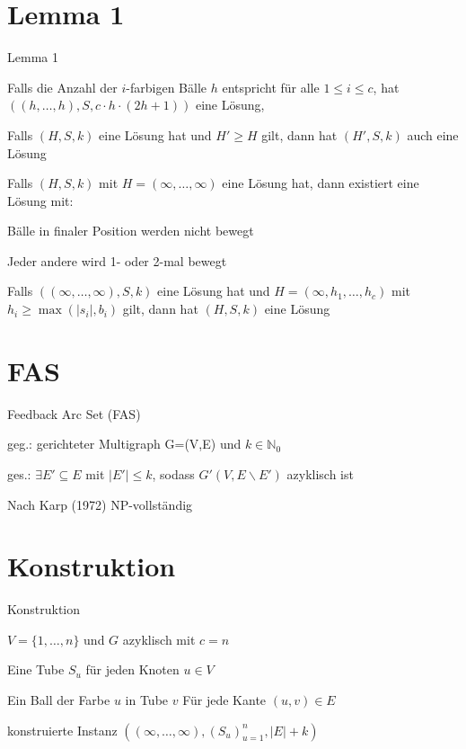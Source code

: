 \documentclass{beamer}
\begin{document}
\section*{Lemma 1}
\begin{frame}{Lemma 1}
\begin{enumlist}
\item Falls die Anzahl der $i$-farbigen Bälle $h$ entspricht für alle $1 \leq i \leq c$, hat $((h,\dots,h),S,c\cdot h\cdot (2h+1))$ eine Lösung, 
\item Falls $(H,S,k)$ eine Lösung hat und $H' \geq H$ gilt, dann hat $(H',S,k)$ auch eine Lösung
\item Falls $(H,S,k)$ mit $H=(\infty,\dots, \infty)$ eine Lösung hat, dann existiert eine Lösung mit: \begin{pointlist}
\item Bälle in finaler Position werden nicht bewegt
\item Jeder andere wird 1- oder 2-mal bewegt
\end{pointlist}
\item Falls $((\infty, \dots,\infty),S,k)$ eine Lösung hat und $H=(\infty, h_1,\dots, h_c)$ mit $h_i \geq \max(|s_i|,b_i)$ gilt, dann hat $(H,S,k)$ eine Lösung
\end{enumlist}
\end{frame}

\section*{FAS}
\begin{frame}{Feedback Arc Set (FAS)}
\begin{pointlist}
\item geg.: gerichteter Multigraph G=(V,E) und $k\in\mathbb{N}_0$
\item ges.: $\exists E' \subseteq E$ mit $|E'|\leq k$, sodass $G'(V,E\backslash E')$ azyklisch ist
\begin{arrowlist}
\item Nach Karp (1972) NP-vollständig
\end{arrowlist}
\end{pointlist}
\end{frame}

\section*{Konstruktion}
\begin{frame}{Konstruktion}
\begin{pointlist}
\item $V=\{1,\dots,n\}$ und $G$ azyklisch mit $c=n$
\begin{arrowlist}
\item Eine Tube $S_u$ für jeden Knoten $u\in V$
\item Ein Ball der Farbe $u$ in Tube $v$ Für jede Kante $(u,v)\in E$
\item konstruierte Instanz $((\infty, \dots, \infty), (S_u)_{u=1}^n, |E|+k)$
\end{arrowlist}
\end{pointlist}
\end{frame}
\end{document}
